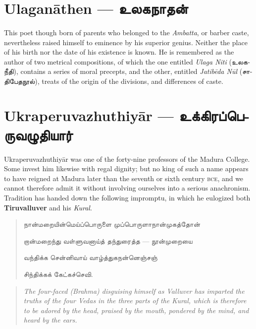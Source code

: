 \documentclass{article}
\newcommand{\TamilText}[1]{\texttamil{#1}}
\newcommand{\TamilBold}[1]{\texttamil{\textbf{#1}}}
\newcommand{\tam}[1]{\TamilText{#1}}
\newcommand{\tambold}[1]{\TamilBold{#1}}
\begin{document}
\section{Ulagan\={a}then --- \tambold{உலகநாதன்}}
\paragraph{}
This poet though born of parents who belonged to the \emph{Ambatta}, or barber caste, nevertheless raised himself to eminence by his superior genius. Neither the place of his birth nor the date of his existence is known. He is remembered as the author of two metrical compositions, of which the one entitled \emph{Ulaga Niti} (\tam{உலகநீதி}), contains a series of moral precepts, and the other, entitled \emph{Jatib\={e}da N\={u}l} (\tam{சாதிபேதநூல்}), treats of the origin of the divisions, and differences of caste.

\section{Ukraperuvazhuthiy\={a}r --- \tambold{உக்கிரப்பெருவழுதியார்}}
\paragraph{}
Ukraperuvazhuthiy\={a}r was one of the forty-nine professors of the Madura College. Some invest him likewise with regal dignity; but no king of such a name appears to have reigned at Madura later than the seventh or sixth century \textsc{bce}, and we cannot therefore admit it without involving ourselves into a serious anachronism. Tradition has handed down the following impromptu, in which he eulogized both \textbf{Tiruvalluver} and his \emph{Kural}.
\begin{quotation}\small
\tam{நான்மறையின்மெய்ப்பொருளை முப்பொருளாநான்முகத்தோன்‌}

\tam{றான்மறைந்து வள்ளுவனாய்த்‌ தந்‌துரைத்த} --- \tam{நூன்முறையை}

\tam{வந்திக்க சென்னிவாய்‌ வாழ்த்துகநன்னெஞ்சஞ்‌}

\tam{சிந்திக்கக் கேட்கச்செவி}.
\end{quotation}
\begin{quotation}\small
\emph{The four-faced (Brahma) disguising himself as Valluver has imparted the truths of the four Vedas in the three parts of the Kural, which is therefore to be adored by the head, praised by the mouth, pondered by the mind, and heard by the ears.}
\end{quotation}
\end{document}
